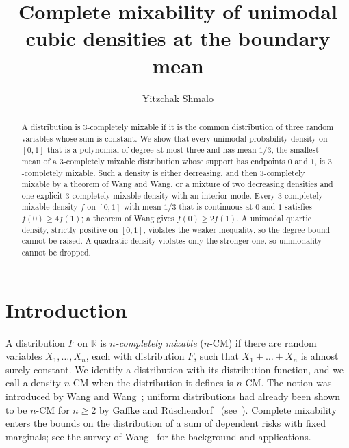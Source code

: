 \documentclass[11pt]{amsart}
\theoremstyle{remark}
\numberwithin{equation}{section}
\begin{document}
\title[Unimodal cubic densities at the boundary mean]{Complete mixability of unimodal cubic densities at the boundary mean}
\author{Yitzchak Shmalo}
\address{Einstein Institute of Mathematics, The Hebrew University of Jerusalem, Jerusalem, Israel}
\date{}

\begin{abstract}
A distribution is $3$-completely mixable if it is the common distribution
of three random variables whose sum is constant. We show that every unimodal
probability density on $[0,1]$ that is a polynomial of degree at most three
and has mean $1/3$, the smallest mean of a $3$-completely mixable
distribution whose support has endpoints $0$ and $1$, is
$3$-completely mixable. Such a density is either decreasing, and then
$3$-completely mixable by a theorem of Wang and Wang, or a mixture of
two decreasing densities and one explicit $3$-completely mixable density with
an interior mode. Every $3$-completely mixable density $f$ on $[0,1]$ with mean
$1/3$ that is continuous at $0$ and $1$ satisfies $f(0)\ge4f(1)$; a theorem
of Wang gives $f(0)\ge2f(1)$. A unimodal quartic density, strictly
positive on $[0,1]$, violates the weaker inequality, so the degree bound
cannot be raised. A quadratic density violates only the stronger one, so
unimodality cannot be dropped.
\end{abstract}

\maketitle

\section{Introduction}

A distribution $F$ on $\mathbb{R}$ is \emph{$n$-completely mixable} ($n$-CM)
if there are random variables $X_1,\dots,X_n$, each with distribution $F$,
such that $X_1+\dots+X_n$ is almost surely constant. We identify a
distribution with its distribution function, and we call a density $n$-CM
when the distribution it defines is $n$-CM. The notion was introduced by
Wang and Wang~\cite{WW11}; uniform distributions had already been shown to
be $n$-CM for $n\ge2$ by Gaffke and R\"uschendorf~\cite{GR81}
(see~\cite[Section~1.4]{Wan15}). Complete mixability enters the bounds on
the distribution of a sum of dependent risks with fixed marginals; see the
survey of Wang~\cite{Wan15} for the background and applications.
\end{document}
